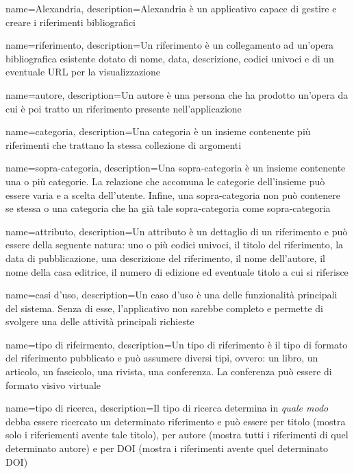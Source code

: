 
{
    name={Alexandria},
    description={Alexandria è un applicativo capace di gestire e creare i riferimenti bibliografici}
}

{
    name={riferimento},
    description={Un riferimento è un collegamento ad un'opera bibliografica esistente dotato di nome, data, descrizione, codici univoci e di un eventuale URL per la visualizzazione}
}

{
    name={autore},
    description={Un autore è una persona che ha prodotto un'opera da cui è poi tratto un riferimento presente nell'applicazione}
}

{
    name={categoria},
    description={Una categoria è un insieme contenente più riferimenti che trattano la stessa collezione di argomenti}
}

{
    name={sopra-categoria},
    description={Una sopra-categoria è un insieme contenente una o più categorie. La relazione che accomuna le categorie dell'insieme può essere varia e a scelta dell'utente. Infine, una sopra-categoria non può contenere se stessa o una categoria che ha già tale sopra-categoria come sopra-categoria}
}

{
    name={attributo},
    description={Un attributo è un dettaglio di un riferimento e può essere della seguente natura: uno o più codici univoci, il titolo del riferimento, la data di pubblicazione, una descrizione del riferimento, il nome dell'autore, il nome della casa editrice, il numero di edizione ed eventuale titolo a cui si riferisce}
}

{
    name={casi d'uso},
    description={Un caso d'uso è una delle funzionalità principali del sistema. Senza di esse, l'applicativo non sarebbe completo e permette di svolgere una delle attività principali richieste}
}

{
    name={tipo di rifeirmento},
    description={Un tipo di riferimento è il tipo di formato del riferimento pubblicato e può assumere diversi tipi, ovvero: un libro, un articolo, un fascicolo, una rivista, una conferenza. La conferenza può essere di formato visivo virtuale}
}

{
    name={tipo di ricerca},
    description={Il tipo di ricerca determina in \textit{quale modo} debba essere ricercato un determinato riferimento e può essere per titolo (mostra solo i riferiementi avente tale titolo), per autore (mostra tutti i riferimenti di quel determinato autore) e per DOI (mostra i riferimenti avente quel determinato DOI)}
}


